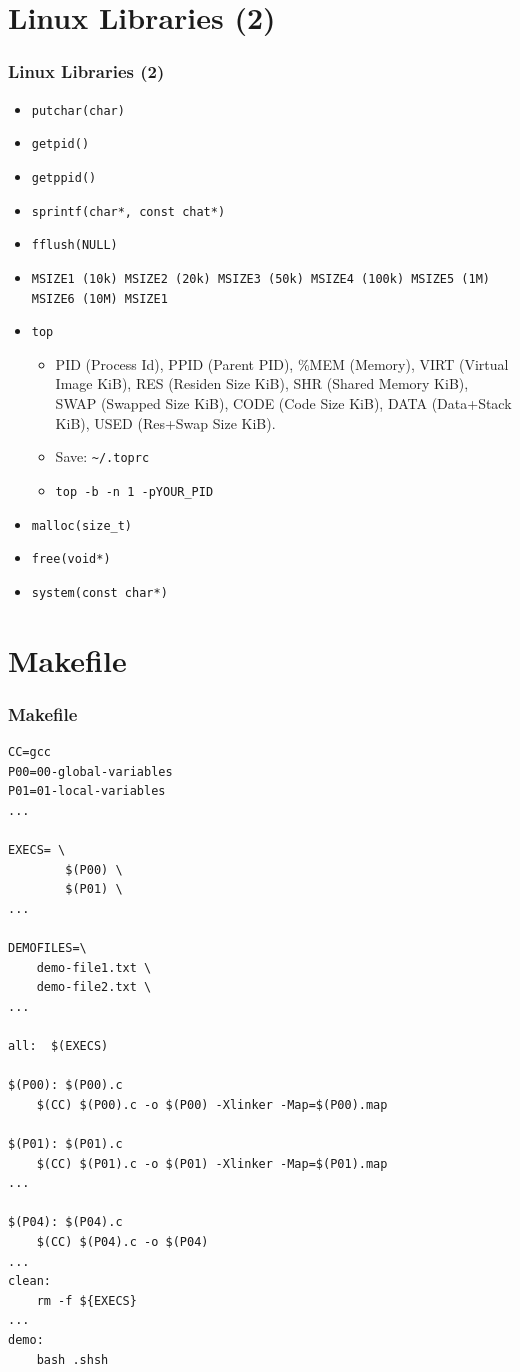 \documentclass[xcolor=table, notheorems, hyperref={pdfpagelabels=false}]{beamer}
\begin{document}
\section{Linux Libraries (2)}
\begin{frame}
\frametitle{Linux Libraries (2)}
\begin{itemize}
\item \texttt{putchar(char)}
\item \texttt{getpid()}
\item \texttt{getppid()}
\item \texttt{sprintf(char*, const chat*)}
\item \texttt{fflush(NULL)}
\item \texttt{MSIZE1 (10k) MSIZE2 (20k) MSIZE3 (50k) MSIZE4 (100k) MSIZE5 (1M) MSIZE6 (10M) MSIZE1}
\item \texttt{top}
\begin{itemize}
\item PID (Process Id), PPID (Parent PID), \%MEM (Memory), VIRT (Virtual Image KiB), 
	RES (Residen Size KiB), SHR (Shared Memory KiB), SWAP (Swapped Size KiB), 
	CODE (Code Size KiB), DATA (Data+Stack KiB), USED (Res+Swap Size KiB).
\item Save: \texttt{\textasciitilde{}/.toprc}
\item \texttt{top -b -n 1 -pYOUR\_PID}
\end{itemize}
\item \texttt{malloc(size\_t)}
\item \texttt{free(void*)}
\item \texttt{system(const char*)}
\end{itemize}
\end{frame}

\section{Makefile}
\begin{frame}[fragile]
\frametitle{Makefile}
\begin{lstlisting}[basicstyle=\ttfamily\tiny]
CC=gcc
P00=00-global-variables
P01=01-local-variables
...
	
EXECS= \
        $(P00) \
        $(P01) \
...

DEMOFILES=\
	demo-file1.txt \
	demo-file2.txt \
...

all:  $(EXECS)

$(P00): $(P00).c
	$(CC) $(P00).c -o $(P00) -Xlinker -Map=$(P00).map

$(P01): $(P01).c
	$(CC) $(P01).c -o $(P01) -Xlinker -Map=$(P01).map
...

$(P04): $(P04).c
	$(CC) $(P04).c -o $(P04)
...
clean:
	rm -f ${EXECS} 
...
demo:
	bash .shsh
\end{lstlisting}
\end{frame}
\end{document}
